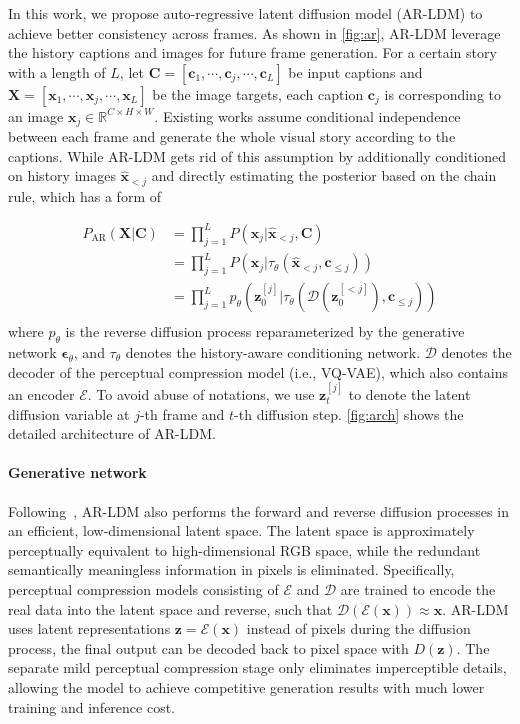 \documentclass[10pt,twocolumn,letterpaper]{article}
\begin{document}
In this work, we propose auto-regressive latent diffusion model (AR-LDM) to achieve better consistency across frames. As shown in \cref{fig:ar}, AR-LDM leverage the history captions and images for future frame generation. For a certain story with a length of $L$, let $\mathbf{C} = [\mathbf{c}_1,\cdots, \mathbf{c}_j, \cdots, \mathbf{c}_L]$ be input captions and $\mathbf{X} = [\mathbf{x}_1, \cdots, \mathbf{x}_j, \cdots,\mathbf{x}_L]$ be the image targets, each caption $\mathbf{c}_j$ is corresponding to an image $\mathbf{x}_j \in \mathbb{R}^{C\times H\times W}$. Existing works assume conditional independence between each frame and generate the whole visual story according to the captions. While AR-LDM gets rid of this assumption by additionally conditioned on history images $\hat{\mathbf{x}}_{<j}$ and directly estimating the posterior based on the chain rule, which has a form of

\begin{equation}
\begin{aligned}
    P_{\text{AR}}(\mathbf{X}|\mathbf{C}) &= \prod_{j=1}^L P(\mathbf{x}_j \vert \hat{\mathbf{x}}_{<j}, \mathbf{C})\\
    &= \prod_{j=1}^L P(\mathbf{x}_{j} \vert \tau_{\theta}(\hat{\mathbf{x}}_{<j}, \mathbf{c}_{\leq j}))\\
    &= \prod_{j=1}^L p_\theta(\mathbf{z}_{0}^{[j]} \vert \tau_{\theta}(\mathcal{D}(\mathbf{z}_0^{[<j]}), \mathbf{c}_{\leq j}))\\
\end{aligned}
\label{eq:ar}
\end{equation}
where $p_\theta$ is the reverse diffusion process reparameterized by the generative network $\boldsymbol{\epsilon}_{\theta}$, and $\tau_{\theta}$ denotes the history-aware conditioning network. $\mathcal{D}$ denotes the decoder of the perceptual compression model (i.e., VQ-VAE), which also contains an encoder $\mathcal{E}$. To avoid abuse of notations, we use $\mathbf{z}_t^{[j]}$ to denote the latent diffusion variable at $j$-th frame and $t$-th diffusion step. \cref{fig:arch} shows the detailed architecture of AR-LDM.

\paragraph{Generative network}
Following~\cite{ldm}, AR-LDM also performs the forward and reverse diffusion processes in an efficient, low-dimensional latent space. The latent space is approximately perceptually equivalent to high-dimensional RGB space, while the redundant semantically meaningless information in pixels is eliminated. Specifically, perceptual compression models consisting of $\mathcal{E}$ and $\mathcal{D}$ are trained to encode the real data into the latent space and reverse, such that $\mathcal{D}(\mathcal{E}(\mathbf{x})) \approx \mathbf{x}$. AR-LDM uses latent representations $\mathbf{z} = \mathcal{E}(\mathbf{x})$ instead of pixels during the diffusion process, the final output can be decoded back to pixel space with $D(\mathbf{z})$. The separate mild perceptual compression stage only eliminates imperceptible details, allowing the model to achieve competitive generation results with much lower training and inference cost.
\end{document}
